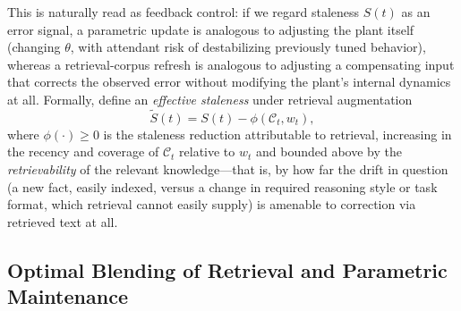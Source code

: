 \documentclass[electronics,article,submit,pdftex,moreauthors]{Definitions/mdpi}
\newcommand{\calC}{\mathcal{C}}
\begin{document}
This is naturally read as feedback control: if we regard staleness $S(t)$ as an error signal, a parametric update is analogous to adjusting the plant itself (changing $\theta$, with attendant risk of destabilizing previously tuned behavior), whereas a retrieval-corpus refresh is analogous to adjusting a compensating input that corrects the observed error without modifying the plant's internal dynamics at all. Formally, define an \textit{effective staleness} under retrieval augmentation
\begin{equation}\label{eq:effstaleness}
\tilde{S}(t)=S(t)-\phi(\calC_t,w_t),
\end{equation}
where $\phi(\cdot)\ge 0$ is the staleness reduction attributable to retrieval, increasing in the recency and coverage of $\calC_t$ relative to $w_t$ and bounded above by the \textit{retrievability} of the relevant knowledge---that is, by how far the drift in question (a new fact, easily indexed, versus a change in required reasoning style or task format, which retrieval cannot easily supply) is amenable to correction via retrieved text at all.

\subsection{Optimal Blending of Retrieval and Parametric Maintenance}\label{sec:blending}
\end{document}
